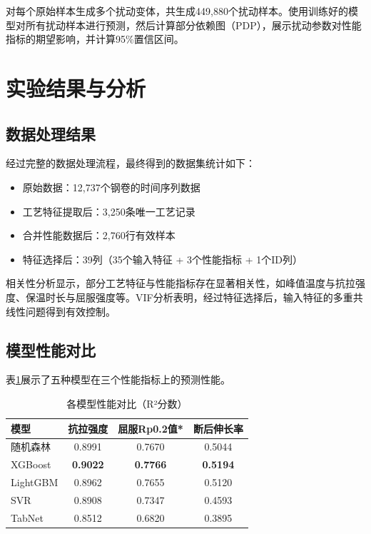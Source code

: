 \documentclass[12pt,a4paper]{article}
\begin{document}
对每个原始样本生成多个扰动变体，共生成449,880个扰动样本。使用训练好的模型对所有扰动样本进行预测，然后计算部分依赖图（PDP），展示扰动参数对性能指标的期望影响，并计算95\%置信区间。

\section{实验结果与分析}

\subsection{数据处理结果}

经过完整的数据处理流程，最终得到的数据集统计如下：
\begin{itemize}
\item 原始数据：12,737个钢卷的时间序列数据
\item 工艺特征提取后：3,250条唯一工艺记录
\item 合并性能数据后：2,760行有效样本
\item 特征选择后：39列（35个输入特征 + 3个性能指标 + 1个ID列）
\end{itemize}

相关性分析显示，部分工艺特征与性能指标存在显著相关性，如峰值温度与抗拉强度、保温时长与屈服强度等。VIF分析表明，经过特征选择后，输入特征的多重共线性问题得到有效控制。

\subsection{模型性能对比}

表\ref{tab:performance}展示了五种模型在三个性能指标上的预测性能。

\begin{table}[H]
\centering
\caption{各模型性能对比（R²分数）}
\label{tab:performance}
\begin{tabular}{lccc}
\toprule
模型 & 抗拉强度 & 屈服Rp0.2值* & 断后伸长率 \\
\midrule
随机森林 & 0.8991 & 0.7670 & 0.5044 \\
XGBoost & \textbf{0.9022} & \textbf{0.7766} & \textbf{0.5194} \\
LightGBM & 0.8962 & 0.7655 & 0.5120 \\
SVR & 0.8908 & 0.7347 & 0.4593 \\
TabNet & 0.8512 & 0.6820 & 0.3895 \\
\bottomrule
\end{tabular}
\end{table}
\end{document}
